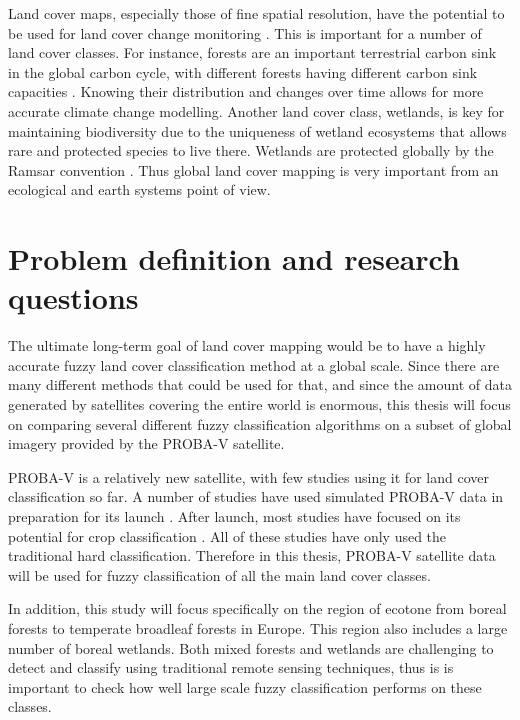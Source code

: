 \documentclass[a4paper,10pt]{article}
\begin{document}
Land cover maps, especially those of fine spatial resolution, have the potential to be used for land cover change monitoring \cite{defourny2012cci}. This is important for a number of land cover classes. For instance, forests are an important terrestrial carbon sink in the global carbon cycle, with different forests having different carbon sink capacities \cite{pan2011large}. Knowing their distribution and changes over time allows for more accurate climate change modelling. Another land cover class, wetlands, is key for maintaining biodiversity due to the uniqueness of wetland ecosystems that allows rare and protected species to live there. Wetlands are protected globally by the Ramsar convention \cite{davis1994ramsar}. Thus global land cover mapping is very important from an ecological and earth systems point of view.

\section{Problem definition and research questions}

The ultimate long-term goal of land cover mapping would be to have a highly accurate fuzzy land cover classification method at a global scale. Since there are many different methods that could be used for that, and since the amount of data generated by satellites covering the entire world is enormous, this thesis will focus on comparing several different fuzzy classification algorithms on a subset of global imagery provided by the PROBA-V satellite.

PROBA-V is a relatively new satellite, with few studies using it for land cover classification so far. A number of studies have used simulated PROBA-V data in preparation for its launch \cite{stathakis2014probavurban} \cite{roumenina2013probavcrops} \cite{bartalev2014probavboreal}. After launch, most studies have focused on its potential for crop classification \cite{roumenina2015probavcrops} \cite{durgun2016crop} \cite{lambert2016cropland}. All of these studies have only used the traditional hard classification. Therefore in this thesis, PROBA-V satellite data will be used for fuzzy classification of all the main land cover classes.

In addition, this study will focus specifically on the region of ecotone from boreal forests to temperate broadleaf forests in Europe. This region also includes a large number of boreal wetlands. Both mixed forests and wetlands are challenging to detect and classify using traditional remote sensing techniques, thus is is important to check how well large scale fuzzy classification performs on these classes.
\end{document}
